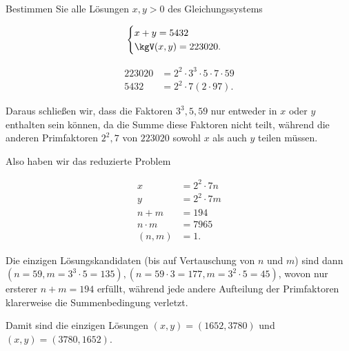 
\begin{exercise}

Bestimmen Sie alle Lösungen $x, y > 0$ des Gleichungssystems

\begin{align*}
    \begin{cases}
        x + y = 5432 \\
        \kgV(x,y) = 223020.
    \end{cases}
\end{align*}

\end{exercise}


\begin{solution}

\begin{align*}
    223020 &= 2^2\cdot 3^3 \cdot 5 \cdot 7 \cdot 59 \\
    5432 &= 2^2 \cdot 7 (2\cdot 97).
\end{align*}

Daraus schließen wir, dass die Faktoren $3^3,5,59$ nur entweder in $x$
oder $y$ enthalten sein können, da die Summe diese Faktoren nicht teilt,
während die anderen Primfaktoren $2^2,7$ von $223020$ sowohl $x$ als auch $y$ teilen müssen.


Also haben wir das reduzierte Problem

\begin{align*}
    x &= 2^2\cdot 7 n \\
    y &= 2^2\cdot 7 m \\
    n + m &= 194 \\
    n\cdot m &= 7965 \\
    (n,m) &= 1.
\end{align*}

Die einzigen Lösungskandidaten (bis auf Vertauschung von $n$ und $m$) sind dann
$(n = 59, m = 3^3\cdot 5 = 135), (n = 59\cdot 3 = 177, m = 3^2 \cdot 5 = 45)$,
wovon nur ersterer $n+m = 194$ erfüllt, während jede andere Aufteilung der Primfaktoren
klarerweise die Summenbedingung verletzt.

Damit sind die einzigen Lösungen $(x,y) = (1652,3780)$ und $(x,y) = (3780,1652)$.
\end{solution}

